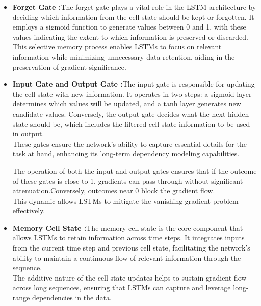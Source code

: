 \begin{itemize}

\item  \textbf{Forget Gate :}The forget gate plays a vital role in the LSTM architecture by deciding which information from the cell state should be kept or forgotten. It employs a sigmoid function to generate values between 0 and 1, with these values indicating the extent to which information is preserved or discarded.\\ 
This selective memory process enables LSTMs to focus on relevant information while minimizing unnecessary data retention, aiding in the preservation of gradient significance.

\item  \textbf{Input Gate and Output Gate :}The input gate is responsible for updating the cell state with new information. It operates in two steps: a sigmoid layer determines which values will be updated, and a tanh layer generates new candidate values.
 Conversely, the output gate decides what the next hidden state should be, which includes the filtered cell state information to be used in output.\\ 
 These gates ensure the network's ability to capture essential details for the task at hand, enhancing its long-term dependency modeling capabilities.

The operation of both the input and output gates ensures that if the outcome of these gates is close to 1, gradients can pass through without significant attenuation.Conversely, outcomes near 0 block the gradient flow. \\
This dynamic allows LSTMs to mitigate the vanishing gradient problem effectively.

\item  \textbf{Memory Cell State :}The memory cell state is the core component that allows LSTMs to retain information across time steps. It integrates inputs from the current time step and previous cell state, facilitating the network's ability to maintain a continuous flow of relevant information through the sequence. \\
The additive nature of the cell state updates helps to sustain gradient flow across long sequences, ensuring that LSTMs can capture and leverage long-range dependencies in the data.

\end{itemize}

